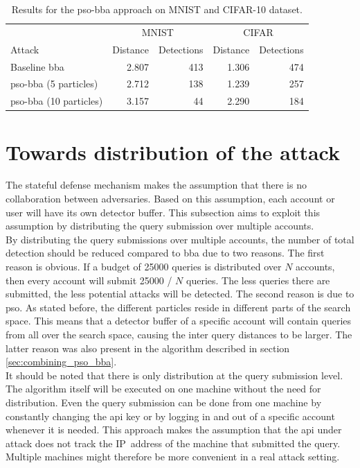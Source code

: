 \begin{table}
	\centering
	\caption[PSO-BBA results]{Results for the \gls{pso}-\gls{bba} approach on MNIST and CIFAR-10 dataset.}
	\label{tbl:pso_bba}
	\begin{tabular}{lrrrr}\toprule
			& \multicolumn{2}{c}{MNIST} &\multicolumn{2}{c}{CIFAR} \\ \cmidrule(r){2-3} \cmidrule(r){4-5}
	Attack				&Distance	&Detections	&Distance	&Detections \\ \midrule
	Baseline \gls{bba}	&2.807		&413		&1.306			&474 \\
	\gls{pso}-\gls{bba} (5 particles)	&2.712			&138			&1.239				&257 \\ 
	\gls{pso}-\gls{bba} (10 particles)	&3.157			&44			&2.290				&184 \\
	
	\bottomrule
	
	\end{tabular}
\end{table}

\section{Towards distribution of the attack}
The stateful defense mechanism \cite{chen_stateful_2019} makes the assumption that there is no collaboration between adversaries. Based on this assumption, each account or user will have its own detector buffer. This subsection aims to exploit this assumption by distributing the query submission over multiple accounts.\\

By distributing the query submissions over multiple accounts, the number of total detection should be reduced compared to \gls{bba} due to two reasons. The first reason is obvious. If a budget of \num{25000} queries is distributed over $N$ accounts, then every account will submit \num{25000} / $N$ queries. The less queries there are submitted, the less potential attacks will be detected. The second reason is due to \gls{pso}. As stated before, the different particles reside in different parts of the search space. This means that a detector buffer of a specific account will contain queries from all over the search space, causing the inter query distances to be larger. The latter reason was also present in the algorithm described in section \ref{sec:combining_pso_bba}.\\

It should be noted that there is only distribution at the query submission level. The algorithm itself will be executed on one machine without the need for distribution. Even the query submission can be done from one machine by constantly changing the \gls{api} key or by logging in and out of a specific account whenever it is needed. This approach makes the assumption that the \gls{api} under attack does not track the IP~address of the machine that submitted the query. Multiple machines might therefore be more convenient in a real attack setting.\\

